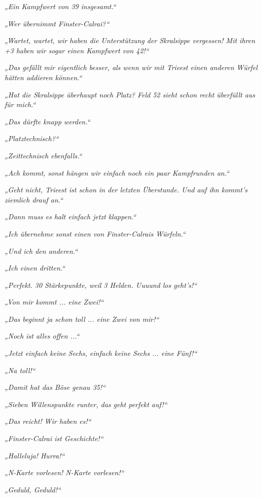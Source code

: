 \textit{„Ein Kampfwert von 39 insgesamt.“}

\textit{„Wer übernimmt Finster-Calrai?“}

\textit{„Wartet, wartet, wir haben die Unterstützung der Skralsippe vergessen! Mit ihren +3 haben wir sogar einen Kampfwert von 42!“}

\textit{„Das gefällt mir eigentlich besser, als wenn wir mit Trieest einen anderen Würfel hätten addieren können.“}

\textit{„Hat die Skralsippe überhaupt noch Platz? Feld 52 sieht schon recht überfüllt aus für mich.“}

\textit{„Das dürfte knapp werden.“}

\textit{„Platztechnisch?“}

\textit{„Zeittechnisch ebenfalls.“}

\textit{„Ach kommt, sonst hängen wir einfach noch ein paar Kampfrunden an.“}

\textit{„Geht nicht, Trieest ist schon in der letzten Überstunde. Und auf ihn kommt’s ziemlich drauf an.“}

\textit{„Dann muss es halt einfach jetzt klappen.“}

\textit{„Ich übernehme sonst einen von Finster-Calrais Würfeln.“}

\textit{„Und ich den anderen.“}

\textit{„Ich einen dritten.“}

\textit{„Perfekt. 30 Stärkepunkte, weil 3 Helden. Uuuund los geht’s!“}

\textit{„Von mir kommt ... eine Zwei!“}

\textit{„Das beginnt ja schon toll ... eine Zwei von mir!“}

\textit{„Noch ist alles offen ...“}

\textit{„Jetzt einfach keine Sechs, einfach keine Sechs ... eine Fünf!“}

\textit{„Na toll!“}

\textit{„Damit hat das Böse genau 35!“}

\textit{„Sieben Willenspunkte runter, das geht perfekt auf!“}

\textit{„Das reicht! Wir haben es!“}

\textit{„Finster-Calrai ist Geschichte!“}

\textit{„Halleluja! Hurra!“}

\textit{„N-Karte vorlesen! N-Karte vorlesen!“}

\textit{„Geduld, Geduld!“}\bigskip



